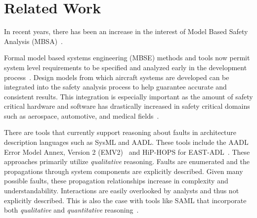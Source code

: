 \section{Related Work}
\label{sec:related_work}

In recent years, there has been an increase in the interest of Model Based Safety Analysis (MBSA)~\cite{Bozzano:2010:DSA:1951720}. 

Formal model based systems engineering (MBSE) methods and tools now permit system level requirements to be specified and analyzed early in the development process~\cite{QFCS15:backes,CIMATTI2015333, NFM2012:CoGaMiWhLaLu, hilt2013:MuWhRaHe, Pajic2012}. Design models from which aircraft systems are developed can be integrated into the safety analysis process to help guarantee accurate and consistent results. This integration is especially important as the amount of safety critical hardware and software has drastically increased in safety critical domains such as aerospace, automotive, and medical fields~\cite{Stewart17:IMBSA}.

There are tools that currently support reasoning about faults in architecture description languages such as SysML and AADL. These tools include the AADL Error Model Annex, Version 2 (EMV2)~\cite{EMV2} and HiP-HOPS for EAST-ADL~\cite{CHEN201391}. These approaches primarily utilize \textit{qualitative} reasoning. Faults are enumerated and the propagations through system components are explicitly described. Given many possible faults, these propagation relationships increase in complexity and understandability. Interactions are easily overlooked by analysts and thus not explicitly described. This is also the case with tools like SAML that incorporate both \textit{qualitative} and \textit{quantitative} reasoning~\cite{Gudemann:2010:FQQ:1909626.1909813}. 


